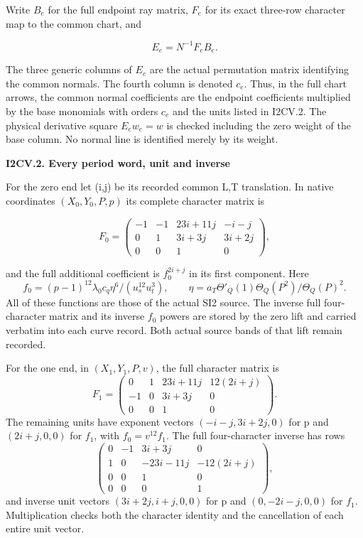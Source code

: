 Write \(B_e\) for the full endpoint ray matrix, \(F_e\) for its exact three-row
character map to the common chart, and

\[
                         E_e=N^{-1}F_eB_e.
\tag{I2CV.1}
\]

The three generic columns of \(E_e\) are the actual permutation matrix
identifying the common normals. The fourth column is denoted \(c_e\).
Thus, in the full chart arrows, the common normal coefficients are
the endpoint coefficients multiplied by the base monomials with
orders \(c_e\) and the units listed in I2CV.2. The physical derivative
square \(E_e w_e=w\) is checked including the zero weight of the base
column. No normal line is identified merely by its weight.

\par

\medskip\noindent\textbf{I2CV.2. Every period word, unit and inverse}

\par\nobreak

For the zero end let (i,j) be its recorded common L,T translation.
In native coordinates \((X_0,Y_0,P,p)\) its complete character matrix is

\[
 F_0=\begin{pmatrix}
 -1&-1&23i+11j&-i-j\\
 0&1&3i+3j&3i+2j\\
 0&0&1&0
 \end{pmatrix},
\tag{I2CV.2}
\]

and the full additional coefficient is \(f_0^{2i+j}\) in its first
component. Here
\[
 f_0=(p-1)^{12}\lambda_0c_q\eta^6/(u_s^{12}u_t^3),\qquad
 \eta=a_T\Theta'_Q(1)\Theta_Q(P^2)/\Theta_Q(P)^2.
\tag{I2CV.3}
\]
All of these functions are those of the actual SI2 source. The
inverse full four-character matrix and its inverse \(f_0\) powers are
stored by the zero lift and carried verbatim into each curve record.
Both actual source bands of that lift remain recorded.

For the one end, in \((X_1,Y_1,P,v)\), the full character matrix is
\[
 F_1=\begin{pmatrix}
 0&1&23i+11j&12(2i+j)\\
 -1&0&3i+3j&0\\
 0&0&1&0
 \end{pmatrix}.
\tag{I2CV.4}
\]
The remaining units have exponent vectors
\((-i-j,3i+2j,0)\) for p and \((2i+j,0,0)\) for \(f_1\),
with \(f_0=v^{12}f_1\). The full four-character inverse has rows
\[
 \begin{pmatrix}
 0&-1&3i+3j&0\\
 1&0&-23i-11j&-12(2i+j)\\
 0&0&1&0\\0&0&0&1
 \end{pmatrix},
\tag{I2CV.5}
\]
and inverse unit vectors \((3i+2j,i+j,0,0)\) for p and
\((0,-2i-j,0,0)\) for \(f_1\). Multiplication checks both the
character identity and the cancellation of each entire unit vector.

